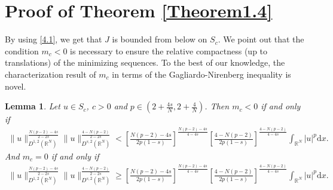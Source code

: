 \documentclass[12pt,a4paper,reqno]{amsart}
\numberwithin{equation}{section}
\newtheorem{lemma}{Lemma}[section]
\begin{document}
\section{Proof of Theorem \ref{Theorem1.4}}
By using \eqref{4.1}, we get that $J$ is bounded from below on $S_{c}$.
We point out that the condition $m_{c}<0$ is necessary to ensure the relative compactness (up to translations) of the minimizing sequences.
To the best of our knowledge,
the characterization result of $m_{c}$ in terms of the Gagliardo-Nirenberg inequality is novel.
\begin{lemma}\label{Lemma6.1}
Let $u\in S_{c}$, $c>0$ and $p\in(2+\frac{4s}{N},2+\frac{4}{N})$. Then $m_{c}<0$ if and only if
\begin{equation*}
\begin{aligned}
\|u\|_{D^{1,2}(\mathbb{R}^{N})}^{\frac{N(p-2)-4s}{2-2s}}
\|u\|_{D^{s,2}(\mathbb{R}^{N})}^{\frac{4-N(p-2)}{2-2s}}
<
\left[
\frac{N(p-2)-4s}{2p(1-s)}
\right]^{\frac{N(p-2)-4s}{4-4s}}
\left[
\frac{4-N(p-2)}{2p(1-s)}
\right]^{\frac{4-N(p-2)}{4-4s}}
\int_{\mathbb{R}^{N}}
|u|^{p}
\mathrm{d}x.
\end{aligned}
\end{equation*}
And $m_{c}=0$ if and only if
\begin{equation*}
\begin{aligned}
\|u\|_{D^{1,2}(\mathbb{R}^{N})}^{\frac{N(p-2)-4s}{2-2s}}
\|u\|_{D^{s,2}(\mathbb{R}^{N})}^{\frac{4-N(p-2)}{2-2s}}
\geqslant
\left[
\frac{N(p-2)-4s}{2p(1-s)}
\right]^{\frac{N(p-2)-4s}{4-4s}}
\left[
\frac{4-N(p-2)}{2p(1-s)}
\right]^{\frac{4-N(p-2)}{4-4s}}
\int_{\mathbb{R}^{N}}
|u|^{p}
\mathrm{d}x.
\end{aligned}
\end{equation*}
\end{lemma}
\end{document}
